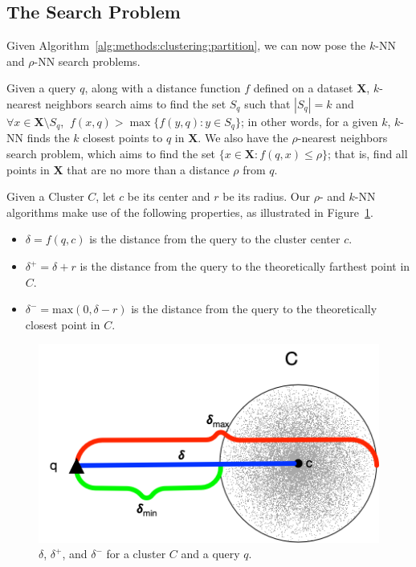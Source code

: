 \subsection{The Search Problem}
\label{subsec:methods:the-search-problem}

Given Algorithm~\ref{alg:methods:clustering:partition}, we can now pose the $k$-NN and $\rho$-NN search problems.

Given a query $q$, along with a distance function $f$ defined on a dataset $\textbf{X}$, $k$-nearest neighbors search aims to find the set $S_q$ such that $|S_q| = k$ and $\forall x \in \textbf{X} \setminus S_q$, $\ f(x, q) > \max\{f(y, q): y \in S_q \}$;
in other words, for a given $k$, $k$-NN finds the $k$ closest points to $q$ in $\textbf{X}$.
We also have the $\rho$-nearest neighbors search problem, which aims to find the set $\{x \in \textbf{X}: f(q, x) \leq \rho \}$;
that is, find all points in $\textbf{X}$ that are no more than a distance $\rho$ from $q$.

Given a Cluster $C$, let $c$ be its center and $r$ be its radius. Our $\rho$- and $k$-NN algorithms make use of the following properties, as illustrated in Figure~\ref{fig:methods:deltas}.

\begin{itemize}
    \item $\delta = f(q, c)$ is the distance from the query to the cluster center $c$.
    \item $\delta^{+} = \delta + r$ is the distance from the query to the theoretically farthest point in $C$.
    \item $\delta^{-} = \text{max}(0, \delta - r)$ is the distance from the query to the theoretically closest point in $C$.
\end{itemize}

\begin{figure}[ht!]
    \centering
    \includegraphics[scale=0.5]{images/geometry/deltas.png}
    \caption{$\delta$, $\delta^{+}$, and $\delta^{-}$ for a cluster $C$ and a query $q$.}
    \label{fig:methods:deltas}
\end{figure}

